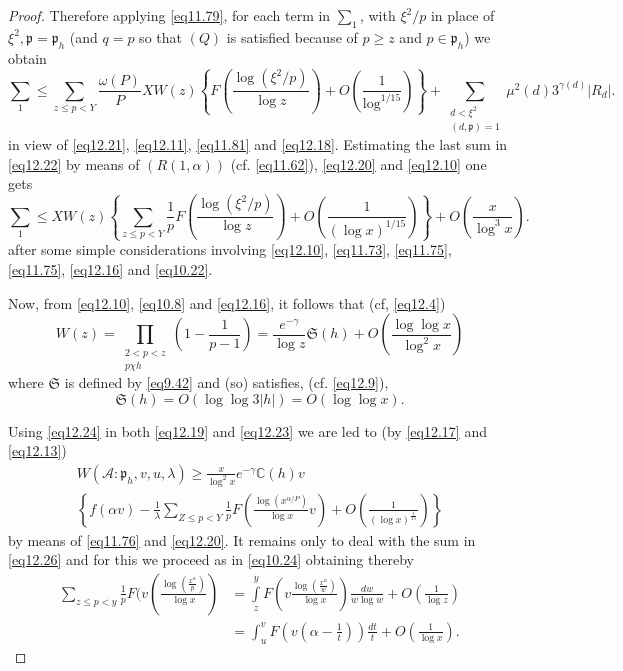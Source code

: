 \begin{proof}
Therefore applying \eqref{eq11.79}, for each term in $\sum_1$, with
$\xi^2/p$ in place of $\xi^2,\mathfrak{p}=\mathfrak{p}_h$ (and $q=p$
so that $(Q)$ is satisfied because of $p \geq z$ and $p \in
\mathfrak{p}_h$) we obtain
{\fontsize{10pt}{12pt}\selectfont 
\begin{equation*}
\sum_1 \leq \sum_{z \leq p<Y} \frac{\omega(P)}{P}XW(z)\left\{
F(\frac{\log(\xi^2 / p)}{\log z})+O(\frac{1}{\log^{1/15}})\right \} +
\sum_{\substack{d < \xi^2 \\ (d, \mathfrak{p})=1}} \mu^2(d)3^{\gamma
  (d)} |R_d|. \tag{12.22}\label{eq12.22}  
\end{equation*}}\relax
in view of \eqref{eq12.21}, \eqref{eq12.11}, \eqref{eq11.81} and
\eqref{eq12.18}. Estimating the
last sum in \eqref{eq12.22} by means of $(R(1, \alpha))$
(cf. \eqref{eq11.62}), \eqref{eq12.20}
and \eqref{eq12.10} one gets 
\begin{equation*}
\sum_1 \leq XW(z)\left \{ \sum_{z \leq p < Y}
\frac{1}{p}F(\frac{\log(\xi^2/p)}{\log z})+ O(\frac{1}{(\log
  x)^{1/15}})\right \}+O(\frac{x}{\log^3
  x}). \tag{12.23}\label{eq12.23}  
\end{equation*}
after some simple considerations involving \eqref{eq12.10}, \eqref{eq11.73},
\eqref{eq11.75}, \eqref{eq11.75}, \eqref{eq12.16} and \eqref{eq10.22}. 

Now, from \eqref{eq12.10}, \eqref{eq10.8} and \eqref{eq12.16}, it
follows that (cf, \eqref{eq12.4}) 
\begin{equation*}
W(z)=\prod_{\substack{2 < p < z\\p \chi
    h}}(1-\frac{1}{p-1})=\frac{e^{-\gamma}}{\log z} \mathfrak{S}
(h)+O(\frac{\log \log x}{\log^2 x}) \tag{12.24}\label{eq12.24} 
\end{equation*}\pageoriginale
where $\mathfrak{S}$ is defined by \eqref{eq9.42} and (so) satisfies,
(cf. \eqref{eq12.9}),
\begin{equation*}
\mathfrak{S} (h)=O(\log \log 3|h|)=O(\log \log
x). \tag{12.25}\label{eq12.25} 
\end{equation*}

Using \eqref{eq12.24} in both \eqref{eq12.19} and \eqref{eq12.23} we
are led to (by \eqref{eq12.17} and \eqref{eq12.13}) 
\begin{gather*}
W(\mathscr{A}:\mathfrak{p}_h,v,u,\lambda)\geq \frac{x}{\log^2 x}e^{-
  \gamma}\mathbb{C}(h)v\\
 \left \{f(\alpha v)- \frac{1}{\lambda} \sum
_{Z \leq p < Y}\frac{1}{p}F(\frac{\log (x^{\alpha/P})}{\log
  x}v)+O(\frac{1}{(\log x)^{\frac{1}{15}}})\right\}
\tag{12.26}\label{eq12.26}  
\end{gather*}
by means of \eqref{eq11.76} and \eqref{eq12.20}. It remains only to
deal with the sum in \eqref{eq12.26} and for this we proceed as in
\eqref{eq10.24} obtaining thereby 
\begin{align*}
\sum_{z \leq p <y} \frac{1}{p}F(v
(\frac{\log(\frac{x^{\alpha}}{p})}{\log x}) &= \int\limits_z^{y} F(v
\frac{\log(\frac{x^\alpha}{w})}{\log x}) \frac{dw}{w \log w}+ O
(\frac{1}{\log z})\\
&=\int_u^v
F(v(\alpha-\frac{1}{t}))\frac{dt}{t}+O(\frac{1}{\log
  x}). \tag{12.27}\label{eq12.27}  
\end{align*}


\end{proof}
